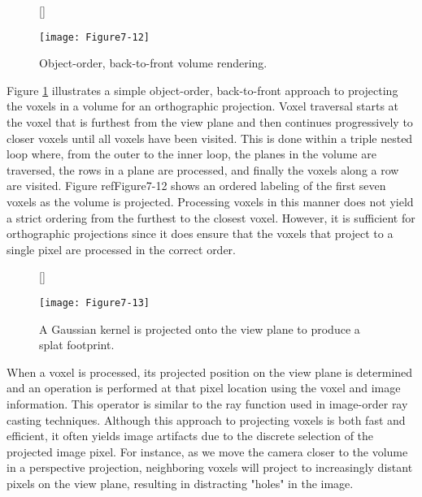 \begin{figure}[!htb]
	[\FBwidth]
	{\caption{Object-order, back-to-front volume rendering.}\label{fig:Figure7-12}}
	{\texttt{[image: Figure7-12]}}
\end{figure}

Figure \ref{fig:Figure7-12} illustrates a simple object-order, back-to-front approach to projecting the voxels in a volume for an orthographic projection. Voxel traversal starts at the voxel that is furthest from the view plane and then continues progressively to closer voxels until all voxels have been visited. This is done within a triple nested loop where, from the outer to the inner loop, the planes in the volume are traversed, the rows in a plane are processed, and finally the voxels along a row are visited. Figure ref{Figure7-12} shows an ordered labeling of the first seven voxels as the volume is projected. Processing voxels in this manner does not yield a strict ordering from the furthest to the closest voxel. However, it is sufficient for orthographic projections since it does ensure that the voxels that project to a single pixel are processed in the correct order.

\begin{figure}[!htb]
	[\FBwidth]
	{\caption{A Gaussian kernel is projected onto the view plane to produce a splat footprint.}\label{fig:Figure7-13}}
	{\texttt{[image: Figure7-13]}}
\end{figure}

When a voxel is processed, its projected position on the view plane is determined and an operation is performed at that pixel location using the voxel and image information. This operator is similar to the ray function used in image-order ray casting techniques. Although this approach to projecting voxels is both fast and efficient, it often yields image artifacts due to the discrete selection of the projected image pixel. For instance, as we move the camera closer to the volume in a perspective projection, neighboring voxels will project to increasingly distant pixels on the view plane, resulting in distracting "holes" in the image.

